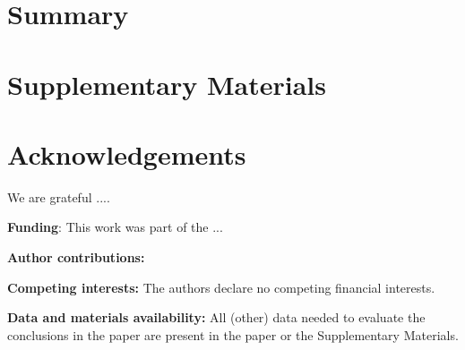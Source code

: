 \documentclass[12pt]{article}
\begin{document}
\section*{Summary}




\section*{Supplementary Materials}

\renewcommand\refname{References and Notes}



\newpage
\section*{Acknowledgements}

We are grateful ....

\noindent
\textbf{Funding}: This work was part of the ...

\noindent
\textbf{Author contributions:} 

\noindent
\textbf{Competing interests:} The authors declare no competing financial interests.

\noindent
\textbf{Data and materials availability:} All (other) data needed to
evaluate the conclusions in the paper are present in the paper or the
Supplementary Materials.

% 
\end{document}
